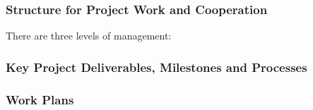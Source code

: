 \documentclass[
  11pt,
]{article}
\begin{document}
\hypertarget{structure-for-project-work-and-cooperation}{%
\subsubsection{Structure for Project Work and
Cooperation}\label{structure-for-project-work-and-cooperation}}

There are three levels of management:

\hypertarget{key-project-deliverables-milestones-and-processes}{%
\subsubsection{Key Project Deliverables, Milestones and
Processes}\label{key-project-deliverables-milestones-and-processes}}

\hypertarget{work-plans}{%
\subsubsection{Work Plans}\label{work-plans}}
\end{document}
